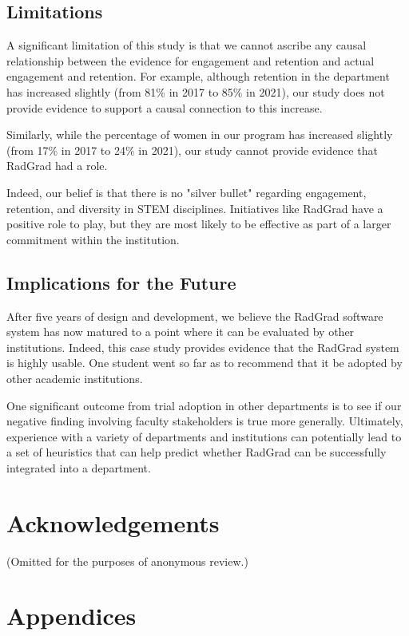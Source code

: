 \documentclass[acmsmall]{acmart}
\begin{document}
\subsection{Limitations}

A significant limitation of this study is that we cannot ascribe any causal relationship between the evidence for engagement and retention and actual engagement and retention. For example, although retention in the department has increased slightly (from 81\% in 2017 to 85\% in 2021), our study does not provide evidence to support a causal connection to this increase.

Similarly, while the percentage of women in our program has increased slightly (from 17\% in 2017 to 24\% in 2021), our study cannot provide evidence that RadGrad had a role.

Indeed, our belief is that there is no "silver bullet" regarding engagement, retention, and diversity in STEM disciplines. Initiatives like RadGrad have a positive role to play, but they are most likely to be effective as part of a larger commitment within the institution.

\subsection{Implications for the Future}

After five years of design and development, we believe the RadGrad software system has now matured to a point where it can be evaluated by other institutions. Indeed, this case study provides evidence that the RadGrad system is highly usable. One student went so far as to recommend that it be adopted by other academic institutions.

One significant outcome from trial adoption in other departments is to see if our negative finding involving faculty stakeholders is true more generally. Ultimately, experience with a variety of departments and institutions can potentially lead to a set of heuristics that can help predict whether RadGrad can be successfully integrated into a department.

\section{Acknowledgements}

(Omitted for the purposes of anonymous review.)

\section{Appendices}
\end{document}
